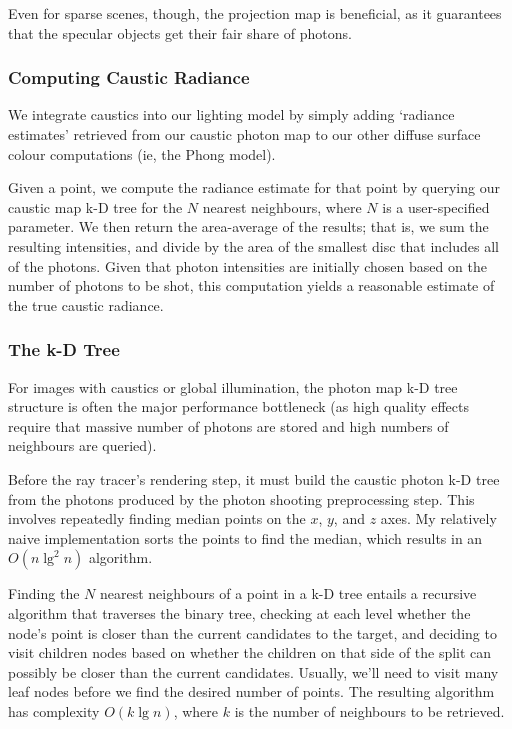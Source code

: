 \documentclass{article}
\begin{document}
Even for sparse scenes, though, the projection map is beneficial, as it guarantees that the specular objects get their fair share of photons.

\subsubsection{Computing Caustic Radiance}

We integrate caustics into our lighting model by simply adding `radiance
estimates' retrieved from our caustic photon map to our other diffuse surface
colour computations (ie, the Phong model).

Given a point, we compute the radiance estimate for that point by querying our
caustic map k-D tree for the $N$ nearest neighbours, where $N$ is a
user-specified parameter. We then return the area-average of the results; that
is, we sum the resulting intensities, and divide by the area
of the smallest disc that includes all of the photons. Given that photon
intensities are initially chosen based on the number of photons to be shot, this
computation yields a reasonable estimate of the true caustic radiance.

\subsubsection{The k-D Tree}

For images with caustics or global illumination, the photon map k-D tree
structure is often the major performance bottleneck (as high quality
effects require that massive number of photons are stored and high numbers of
neighbours are queried).


Before the ray tracer's rendering step, it must build the caustic photon k-D
tree from the photons produced by the photon shooting preprocessing step.
This involves repeatedly finding median points on the $x$, $y$, and $z$ axes. My
relatively naive implementation sorts the points to find the median, which
results in an $O(n\lg^2{n})$ algorithm.

Finding the $N$ nearest neighbours of a point in a k-D tree entails a recursive
algorithm that traverses the binary tree, checking at each level whether the
node's point is closer than the current candidates to the target, and deciding
to visit children nodes based on whether the children on that side of the split
can possibly be closer than the current candidates. Usually, we'll need to visit
many leaf nodes before we find the desired number of points. The resulting
algorithm has complexity $O(k\lg{n})$, where $k$ is the number of neighbours to
be retrieved.
\end{document}
